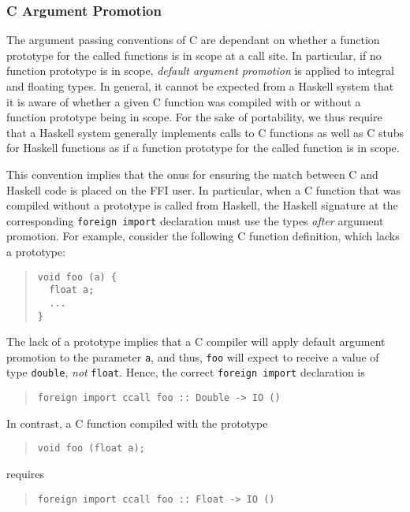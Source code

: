 \documentclass[a4paper,twoside]{article}
\newcommand{\code}[1]{\texttt{#1}}      %
\begin{document}
\subsubsection{C Argument Promotion}

The argument passing conventions of C are dependant on whether a function
prototype for the called functions is in scope at a call site.  In particular,
if no function prototype is in scope, \emph{default argument promotion} is
applied to integral and floating types.  In general, it cannot be expected
from a Haskell system that it is aware of whether a given C function was
compiled with or without a function prototype being in scope.  For the sake of
portability, we thus require that a Haskell system generally implements calls
to C functions as well as C stubs for Haskell functions as if a function
prototype for the called function is in scope.

This convention implies that the onus for ensuring the match between C and
Haskell code is placed on the FFI user.  In particular, when a C function that
was compiled without a prototype is called from Haskell, the Haskell signature
at the corresponding \code{foreign import} declaration must use the types
\emph{after} argument promotion.  For example, consider the following C
function definition, which lacks a prototype:
%
\begin{quote}
\begin{verbatim}
void foo (a) {
  float a;
  ...
}
\end{verbatim}
\end{quote}
%
The lack of a prototype implies that a C compiler will apply default argument
promotion to the parameter \code{a}, and thus, \code{foo} will expect to
receive a value of type \code{double}, \emph{not} \code{float}.  Hence, the
correct \code{foreign import} declaration is
%
\begin{quote}
\begin{verbatim}
foreign import ccall foo :: Double -> IO ()
\end{verbatim}
\end{quote}

In contrast, a C function compiled with the prototype
%
\begin{quote}
\begin{verbatim}
void foo (float a);
\end{verbatim}
\end{quote}
%
requires
%
\begin{quote}
\begin{verbatim}
foreign import ccall foo :: Float -> IO ()
\end{verbatim}
\end{quote}
\end{document}

